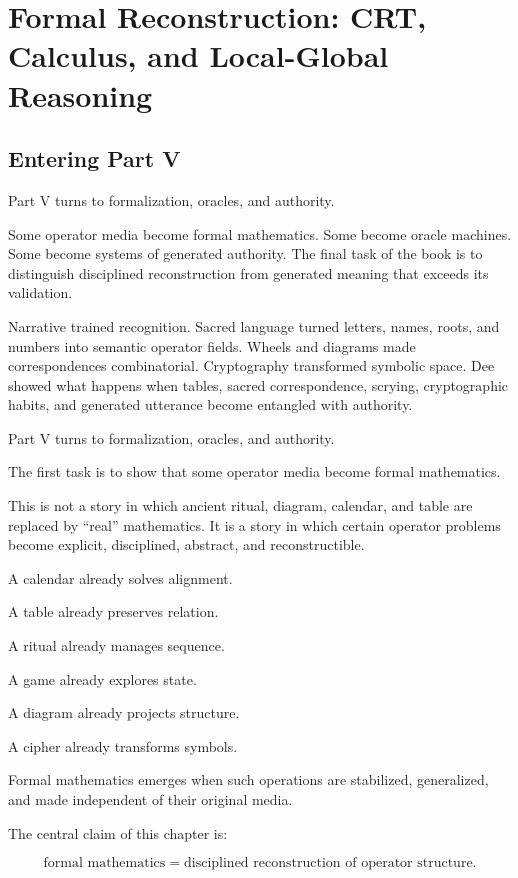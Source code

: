 \documentclass[11pt]{book}
\begin{document}
\chapter[Formal Reconstruction]{Formal Reconstruction: CRT, Calculus, and Local-Global Reasoning}

\section{Entering Part V}

Part V turns to formalization, oracles, and authority.

Some operator media become formal mathematics. Some become oracle machines. Some become systems of generated authority. The final task of the book is to distinguish disciplined reconstruction from generated meaning that exceeds its validation.

Narrative trained recognition. Sacred language turned letters, names, roots, and numbers into semantic operator fields. Wheels and diagrams made correspondences combinatorial. Cryptography transformed symbolic space. Dee showed what happens when tables, sacred correspondence, scrying, cryptographic habits, and generated utterance become entangled with authority.

Part V turns to formalization, oracles, and authority.

The first task is to show that some operator media become formal mathematics.

This is not a story in which ancient ritual, diagram, calendar, and table are replaced by ``real'' mathematics. It is a story in which certain operator problems become explicit, disciplined, abstract, and reconstructible.

A calendar already solves alignment.

A table already preserves relation.

A ritual already manages sequence.

A game already explores state.

A diagram already projects structure.

A cipher already transforms symbols.

Formal mathematics emerges when such operations are stabilized, generalized, and made independent of their original media.

The central claim of this chapter is:

\[
\text{formal mathematics} = \text{disciplined reconstruction of operator structure}.
\]
\end{document}
